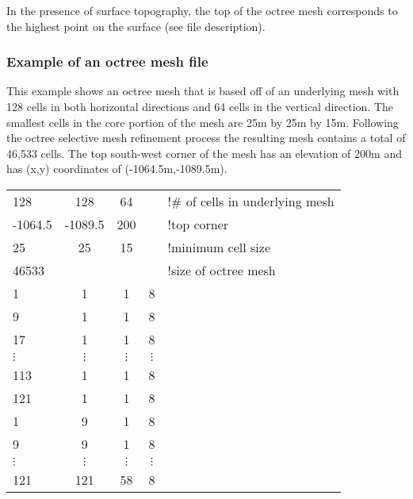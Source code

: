In the presence of surface topography, the top of the octree mesh corresponds to the highest point on the surface (see  file description).

\subsubsection*{Example of an octree mesh file}
This example shows an octree mesh that is based off of an underlying mesh with 128 cells in both horizontal directions and 64 cells in the vertical direction. The smallest cells in the core portion of the mesh are 25m by 25m by 15m. Following the octree selective mesh refinement process the resulting mesh contains a total of 46,533 cells. The top south-west corner of the mesh has an elevation of 200m and has (x,y) coordinates of (-1064.5m,-1089.5m). 

\begin{fileExample}
\begin{tabular}{|lcccl|}
\hline
128       & 128       & 64       &   & !$\#$ of cells in underlying mesh\\
-1064.5   & -1089.5   & 200      &   & !top corner\\
25        & 25        & 15       &   & !minimum cell size\\
46533     &           &          &   & !size of octree mesh\\
1         & 1         & 1        & 8 & \\
9         & 1         & 1        & 8 & \\
17        & 1         & 1        & 8 & \\
$\vdots$  & $\vdots$  & $\vdots$ & $\vdots$ & \\
113       & 1         & 1        & 8 & \\
121       & 1         & 1        & 8 & \\
1         & 9         & 1        & 8 & \\
9         & 9         & 1        & 8 & \\
$\vdots$  & $\vdots$  & $\vdots$ & $\vdots$ & \\
121       & 121       & 58       & 8 & \\
\hline
\end{tabular}
\end{fileExample}